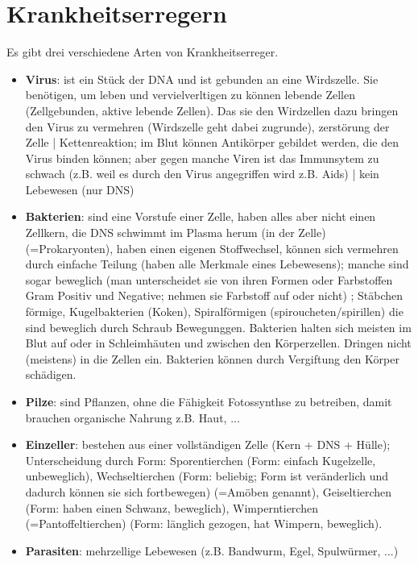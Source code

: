 \documentclass[a4paper]{article}
\begin{document}
\section{Krankheitserregern}

Es gibt drei verschiedene Arten von Krankheitserreger.

\begin{itemize}
\item \textbf{Virus}: ist ein Stück der DNA und ist gebunden an eine Wirdszelle. Sie benötigen, um leben und vervielverltigen zu können lebende Zellen (Zellgebunden, aktive lebende Zellen). Das sie den Wirdzellen dazu bringen den Virus zu vermehren (Wirdszelle geht dabei zugrunde), zerstörung der Zelle | Kettenreaktion; im Blut können Antikörper gebildet werden, die den Virus binden können; aber gegen manche Viren ist das Immunsytem zu schwach (z.B. weil es durch den Virus angegriffen wird z.B. Aids) | kein Lebewesen (nur DNS)

\item \textbf{Bakterien}:  sind eine Vorstufe einer Zelle, haben alles aber nicht einen Zellkern, die DNS schwimmt im Plasma herum (in der Zelle) (=Prokaryonten), haben einen eigenen Stoffwechsel, können sich vermehren durch einfache Teilung (haben alle Merkmale eines Lebewesens); manche sind sogar beweglich (man unterscheidet sie von ihren Formen oder Farbstoffen Gram Positiv und Negative; nehmen sie Farbstoff auf oder nicht) ; Stäbchen förmige, Kugelbakterien (Koken), Spiralförmigen (spiroucheten/spirillen) die sind beweglich durch Schraub Bewegunggen. Bakterien halten sich meisten im Blut auf oder in Schleimhäuten und zwischen den Körperzellen. Dringen nicht (meistens) in die Zellen ein. Bakterien können durch Vergiftung den Körper schädigen.

\item \textbf{Pilze}: sind Pflanzen, ohne die Fähigkeit Fotossynthse zu betreiben, damit brauchen organische Nahrung z.B. Haut, ...

\item\textbf{Einzeller}: bestehen aus einer vollständigen Zelle (Kern + DNS + Hülle); Unterscheidung durch Form: Sporentierchen (Form: einfach Kugelzelle, unbeweglich), Wechseltierchen (Form: beliebig; Form ist veränderlich und dadurch können sie sich fortbewegen) (=Amöben genannt), Geiseltierchen (Form: haben einen Schwanz, beweglich), Wimperntierchen (=Pantoffeltierchen) (Form: länglich gezogen, hat Wimpern, beweglich).

\item \textbf{Parasiten}: mehrzellige Lebewesen (z.B. Bandwurm, Egel, Spulwürmer, ...)
\end{itemize}
\end{document}
